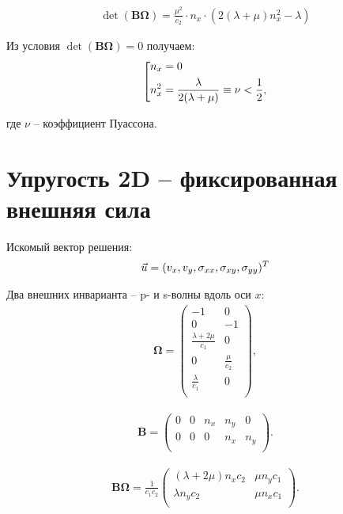 \begin{eqnarray}
	\det (\mathbf{B} \mathbf{\Omega}) = \frac{\mu^{2}}{c_2} \cdot n_x \cdot (2 (\lambda + \mu) n^2_x - \lambda)
\end{eqnarray}

Из условия $\det (\mathbf{B} \mathbf{\Omega}) = 0$ получаем:
\begin{eqnarray}
\left[
\begin{gathered} 
	 n_x = 0  \hfill  \\
	 n^2_x = \frac{\lambda}{2(\lambda + \mu)} \equiv \nu < \frac{1}{2}, \hfill  \\
\end{gathered} 
\right.
\end{eqnarray}

где $\nu$ -- коэффициент Пуассона.


\section{Упругость 2D -- фиксированная внешняя сила}
Искомый вектор решения:
\begin{eqnarray}
	\vec{u}=(v_x,v_y,\sigma_{xx},\sigma_{xy},\sigma_{yy})^{\small{T}}
\end{eqnarray}

Два внешних инварианта -- p- и s-волны вдоль оси $x$:
\begin{align}
\label{outer_waves_elastic2d}
	\mathbf{\Omega} =
	\left( \begin{array}{cccccccccccc}
	-1 & 0   \\
	 0 & -1  \\
	\frac{\lambda+2\mu}{c_1} & 0 \\
	0 & \frac{\mu}{c_2} \\
	\frac{\lambda}{c_1} & 0 \\
	\end{array} \right),
\end{align} 

\begin{align}
	\mathbf{B} =
	\left( \begin{array}{cccccccccccc}
	 0 & 0 & n_x & n_y & 0 \\
	 0 & 0 & 0 & n_x & n_y \\
	\end{array} \right).
\end{align}

\begin{align}
	\mathbf{B} \mathbf{\Omega} = \frac{1}{c_1 c_2}
	\left( \begin{array}{cccccccccccc}
	 (\lambda + 2\mu) n_x c_2 & \mu n_y c_1    \\
	 \lambda n_y c_2          & \mu n_x c_1    \\
	\end{array} \right).
\end{align}

